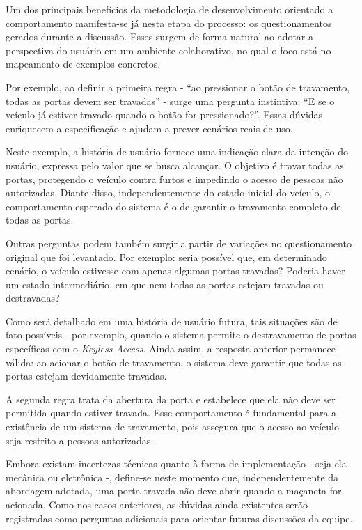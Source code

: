 Um dos principais benefícios da metodologia de desenvolvimento orientado a comportamento manifesta-se já nesta etapa do processo: os questionamentos gerados durante 
a discussão. Esses surgem de forma natural ao adotar a perspectiva do usuário em um ambiente colaborativo, no qual o foco está no mapeamento de exemplos concretos.

Por exemplo, ao definir a primeira regra - ``ao pressionar o botão de travamento, todas as portas devem ser travadas'' - surge uma pergunta instintiva: 
``E se o veículo já estiver travado quando o botão for pressionado?''. Essas dúvidas enriquecem a especificação e ajudam a prever cenários reais de uso.

Neste exemplo, a história de usuário fornece uma indicação clara da intenção do usuário, expressa pelo valor que se busca alcançar. O objetivo é travar todas 
as portas, protegendo o veículo contra furtos e impedindo o acesso de pessoas não autorizadas. Diante disso, independentemente do estado inicial do veículo, 
o comportamento esperado do sistema é o de garantir o travamento completo de todas as portas.

Outras perguntas podem também surgir a partir de variações no questionamento original que foi levantado. Por exemplo: seria possível que, em determinado cenário, 
o veículo estivesse com apenas algumas portas travadas? Poderia haver um estado intermediário, em que nem todas as portas estejam travadas ou destravadas?

Como será detalhado em uma história de usuário futura, tais situações são de fato possíveis - por exemplo, quando o sistema permite o destravamento de portas 
específicas com o \textit{Keyless Access}. Ainda assim, a resposta anterior permanece válida: ao acionar o botão de travamento, o sistema deve garantir que todas as portas 
estejam devidamente travadas.

A segunda regra trata da abertura da porta e estabelece que ela não deve ser permitida quando estiver travada. Esse comportamento é fundamental para a existência 
de um sistema de travamento, pois assegura que o acesso ao veículo seja restrito a pessoas autorizadas.

Embora existam incertezas técnicas quanto à forma de implementação - seja ela mecânica ou eletrônica -, define-se neste momento que, independentemente da abordagem 
adotada, uma porta travada não deve abrir quando a maçaneta for acionada. Como nos casos anteriores, as dúvidas ainda existentes serão registradas como perguntas 
adicionais para orientar futuras discussões da equipe.

